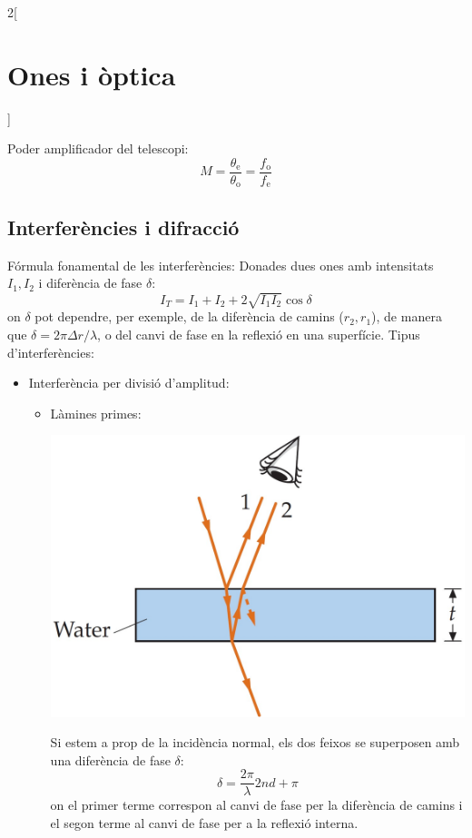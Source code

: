 \documentclass[../../../main.tex]{subfiles}
\begin{document}
\begin{multicols}{2}[\section{Ones i òptica}]
\begin{minipage}{\linewidth}
\end{minipage}
Poder amplificador del telescopi: $$M=\frac{\theta_\text{e}}{\theta_\text{o}}=\frac{f_{\text{o}}}{f_{\text{e}}}$$
\subsection{Interferències i difracció}
Fórmula fonamental de les interferències: Donades dues ones amb intensitats $I_1,I_2$ i diferència de fase $\delta$: $$I_T=I_1+I_2+2\sqrt{I_1I_2}\cos\delta$$
{\footnotesize on $\delta$ pot dependre, per exemple, de la diferència de camins ($r_2,r_1$), de manera que $\delta=2\pi\Delta r/\lambda$, o del canvi de fase en la reflexió en una superfície.}\newline
Tipus d'interferències:
\begin{itemize}
    \item Interferència per divisió d'amplitud:
    \begin{itemize}
        \item Làmines primes:\newline
        \begin{minipage}{\linewidth}
           \centering \includegraphics[width=\linewidth]{Physics/1st/Waves_and_optics/Images/lamprim.jpg} 
        \end{minipage}
Si estem a prop de la incidència normal, els dos feixos se superposen amb una diferència de fase $\delta$: $$\delta=\frac{2\pi}{\lambda}2nd+\pi$$ {\footnotesize on el primer terme correspon al canvi de fase per la diferència de camins i el segon terme al canvi de fase per a la reflexió interna.}

\end{itemize}
\end{itemize}
\end{multicols}
\end{document}
